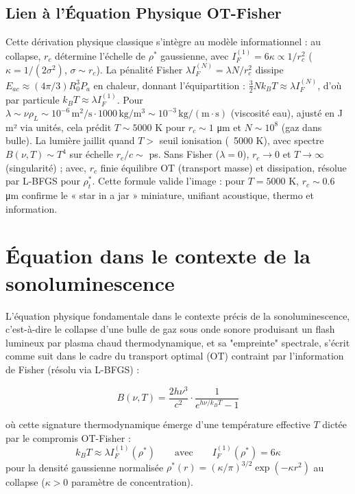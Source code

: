 \documentclass[a4paper,12pt]{article}
\begin{document}
\subsection{Lien à l'Équation Physique OT-Fisher}
Cette dérivation physique classique s'intègre au modèle informationnel : au collapse, \( r_c \) détermine l'échelle de \(\rho^*\) gaussienne, avec \( I_F^{(1)} = 6 \kappa \propto 1 / r_c^2 \) (\(\kappa = 1/(2 \sigma^2)\), \(\sigma \sim r_c\)). La pénalité Fisher \(\lambda I_F^{(N)} = \lambda N / r_c^2\) dissipe \( E_{ac} \approx (4 \pi / 3) R_0^3 P_a\) en chaleur, donnant l'équipartition : \( \frac{3}{2} N k_B T \approx \lambda I_F^{(N)} \), d'où par particule \( k_B T \approx \lambda I_F^{(1)} \). Pour \(\lambda \sim \nu \rho_L \sim 10^{-6} \, \text{m}^2/\text{s} \cdot 1000 \, \text{kg}/\text{m}^3 \sim 10^{-3} \, \text{kg}/(\text{m} \cdot \text{s})\) (viscosité eau), ajusté en J m² via unités, cela prédit \( T \sim 5000 \) K pour \( r_c \sim 1 \) μm et \( N \sim 10^8 \) (gaz dans bulle). La lumière jaillit quand \( T > \) seuil ionisation (~5000 K), avec spectre \( B(\nu, T) \sim T^4 \) sur échelle \( r_c / c \sim \) ps. Sans Fisher (\(\lambda = 0\)), \( r_c \rightarrow 0 \) et \( T \rightarrow \infty \) (singularité) ; avec, \( r_c \) finie équilibre OT (transport masse) et dissipation, résolue par L-BFGS pour \(\rho_t^*\). Cette formule valide l'image : pour \( T = 5000 \) K, \( r_c \sim 0.6 \) μm confirme le « star in a jar » miniature, unifiant acoustique, thermo et information.
\newpage
\section{Équation dans le contexte de la sonoluminescence}

L'équation physique fondamentale dans le contexte précis de la sonoluminescence, c'est-à-dire le collapse d'une bulle de gaz sous onde sonore produisant un flash lumineux par plasma chaud thermodynamique, et sa "empreinte" spectrale, s'écrit comme suit dans le cadre du transport optimal (OT) contraint par l'information de Fisher (résolu via L-BFGS) :

\begin{equation}
B(\nu, T) = \frac{2 h \nu^3}{c^2} \cdot \frac{1}{e^{h\nu / k_B T} - 1}
\end{equation}

où cette signature thermodynamique émerge d'une température effective $T$ dictée par le compromis OT-Fisher :
\begin{equation}
k_B T \approx \lambda I_F^{(1)}(\rho^*) \qquad \text{avec} \qquad I_F^{(1)}(\rho^*) = 6\kappa
\end{equation}
pour la densité gaussienne normalisée $\rho^*(r) = (\kappa/\pi)^{3/2} \exp(-\kappa r^2)$ au collapse ($\kappa > 0$ paramètre de concentration).
\end{document}
